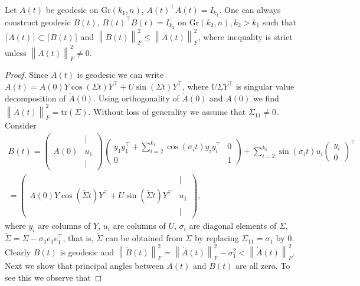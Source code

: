 \documentclass[10pt,a4paper]{amsart}
\begin{document}
\begin{lemma}
	\label{le:geodesic_embedding}
	Let $A(t)$ be geodesic on $\text{Gr}(k_1, n)$, $A(t)^\top A(t) = I_{k_1}$. One can always construct geodesic $B(t)$, $B(t)^\top B(t) = I_{k_2}$ on $\text{Gr}(k_2, n), k_2>k_1$ such that $\lceil A(t)\rceil\subset \lceil B(t)\rceil$ and $\left\|\dot{B}(t)\right\|_{F}^2 \leq \left\|\dot{A}(t)\right\|_{F}^2$, where inequality is strict unless $ \left\|\dot{A}(t)\right\|_{F}^2 \neq 0$.
\end{lemma}

\begin{proof}
	Since $A(t)$ is geodesic we can write $A(t) = A(0) Y \cos(\Sigma t) Y^\top + U\sin(\Sigma t) Y^\top$, where $U \Sigma Y^\top$ is singular value decomposition of $\dot{A}(0)$. Using orthogonality of $\dot{A}(0)$ and $A(0)$ we find $\left\| \dot{A}(t)\right\|_{F}^2 = \text{tr}(\Sigma)$. Without loss of generality we assume that $\Sigma_{11} \neq 0$. Consider
\begin{multline}
	B(t) =
	\begin{pmatrix}
		& | \\
		A(0) & u_1\\
		&|
	\end{pmatrix}
	\begin{pmatrix}
		y_1y_1^\top + \sum_{i=2}^{k_1} \cos(\sigma_i t)y_i y_i^\top & 0\\
		0 & 1
	\end{pmatrix} + \sum_{i=2}^{k_1} \sin(\sigma_i t)u_i \begin{pmatrix}y_i\\0\end{pmatrix}^\top \\
	= \begin{pmatrix}
		& | \\
		A(0) Y \cos\left(\widetilde{\Sigma}t\right) Y^\top + U \sin\left(\widetilde{\Sigma}t\right) Y^\top & u_1\\
		&|
	\end{pmatrix},
\end{multline}
where $y_i$ are columns of $Y$, $u_i$ are columns of $U$, $\sigma_i$ are diagonal elements of $\Sigma$, $\widetilde{\Sigma} = \Sigma - \sigma_1e_1 e_1^\top$, that is, $\widetilde{\Sigma}$ can be obtained from $\Sigma$ by replacing $\Sigma_{11} = \sigma_1$ by $0$.
Clearly $B(t)$ is geodesic and $\left\| \dot{B}(t)\right\|_{F}^2 = \left\| \dot{A}(t)\right\|_{F}^2 - \sigma_1^2 < \left\| \dot{A}(t)\right\|_{F}^2$. Next we show that principal angles between $A(t)$ and $B(t)$ are all zero. To see this we observe that

\end{proof}
\end{document}
